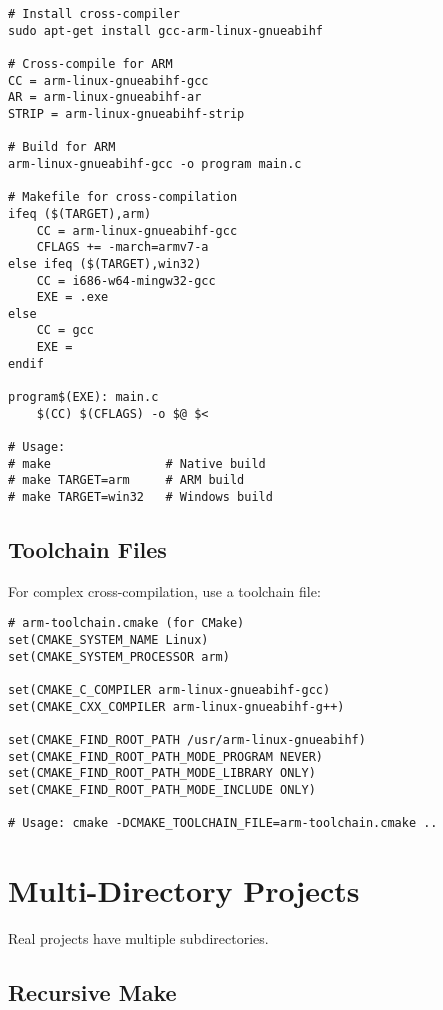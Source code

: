 \begin{lstlisting}
# Install cross-compiler
sudo apt-get install gcc-arm-linux-gnueabihf

# Cross-compile for ARM
CC = arm-linux-gnueabihf-gcc
AR = arm-linux-gnueabihf-ar
STRIP = arm-linux-gnueabihf-strip

# Build for ARM
arm-linux-gnueabihf-gcc -o program main.c

# Makefile for cross-compilation
ifeq ($(TARGET),arm)
    CC = arm-linux-gnueabihf-gcc
    CFLAGS += -march=armv7-a
else ifeq ($(TARGET),win32)
    CC = i686-w64-mingw32-gcc
    EXE = .exe
else
    CC = gcc
    EXE =
endif

program$(EXE): main.c
	$(CC) $(CFLAGS) -o $@ $<

# Usage:
# make                # Native build
# make TARGET=arm     # ARM build
# make TARGET=win32   # Windows build
\end{lstlisting}

\subsection{Toolchain Files}

For complex cross-compilation, use a toolchain file:

\begin{lstlisting}
# arm-toolchain.cmake (for CMake)
set(CMAKE_SYSTEM_NAME Linux)
set(CMAKE_SYSTEM_PROCESSOR arm)

set(CMAKE_C_COMPILER arm-linux-gnueabihf-gcc)
set(CMAKE_CXX_COMPILER arm-linux-gnueabihf-g++)

set(CMAKE_FIND_ROOT_PATH /usr/arm-linux-gnueabihf)
set(CMAKE_FIND_ROOT_PATH_MODE_PROGRAM NEVER)
set(CMAKE_FIND_ROOT_PATH_MODE_LIBRARY ONLY)
set(CMAKE_FIND_ROOT_PATH_MODE_INCLUDE ONLY)

# Usage: cmake -DCMAKE_TOOLCHAIN_FILE=arm-toolchain.cmake ..
\end{lstlisting}

\section{Multi-Directory Projects}

Real projects have multiple subdirectories.

\subsection{Recursive Make}

